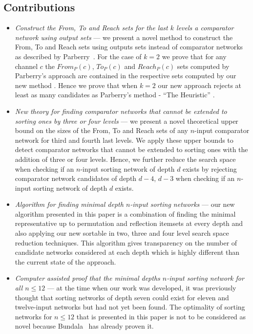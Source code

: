 \documentclass[13pt,a4paper]{article}
\begin{document}
\subsection{Contributions}

\begin{itemize}
	\item \emph{Construct the From, To and Reach sets for the last $k$ levels a comparator network using output sets} --- we present a novel method to construct the From, To and Reach sets using outputs sets instead of comparator networks as described by Parberry~\cite{Parberry89}. For the case of $k = 2$ we prove that for any channel $c$ the $From_P(c)$, $To_P(c)$ and $Reach_P(c)$ sets computed by Parberry's approach are contained in the respective sets computed by our new method . Hence we prove that when $k = 2$ our new approach rejects at least as many candidates as Parberry's method - ``The Heuristic'' \cite{Parberry89}. 
	
	\item \emph{New theory for finding comparator networks that cannot be extended to sorting ones by three or four levels} --- we present a novel theoretical upper bound on the sizes of the From, To and Reach sets of any $n$-input comparator network for third and fourth last levels. We apply these upper bounds to detect comparator networks that cannot be extended to sorting ones with the addition of three or four levels. Hence, we further reduce the search space when checking if an $n$-input sorting network of depth $d$ exists by rejecting comparator network candidates of depth $d-4$, $d-3$ when checking if an $n$-input sorting network of depth $d$ exists.
	
	\item \emph{Algorithm for finding minimal depth $n$-input sorting networks } --- our new algorithm presented in this paper is a combination of finding the minimal representative up to permutation and reflection itemsets at every depth and also applying our new sortable in two, three and four level search space reduction techniques. This algorithm gives transparency on the number of candidate networks considered at each depth which is highly different than the current state of the approach.
	
	\item \emph{Computer assisted proof that the minimal depths $n$-input sorting network for all $n \leq 12$} --- at the time when our work was developed, it was previously thought that sorting networks of depth seven could exist for eleven and twelve-input networks but had not yet been found. The optimality of sorting networks for $n \leq 12$ that is presented in this paper is not to be considered as novel because Bundala~\cite{BundalaCCSZ14_Optimal_Depth} has already proven it.
\end{itemize}
\end{document}

